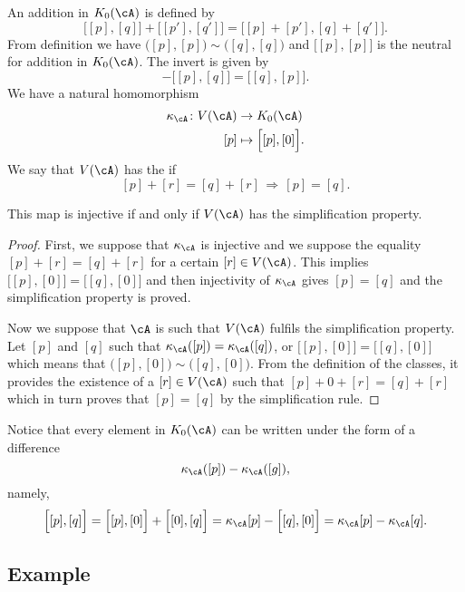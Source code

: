 An addition in $K_0(\cA)$ is defined by
\[
  \Big[ [p],[q] \Big]+\Big[ [p'],[q'] \Big]=\Big[ [p]+[p'],[q]+[q'] \Big].
\]
From definition we have $\Big( [p],[p] \Big)\sim\Big( [q],[q] \Big)$ and $\Big[ [p],[p] \Big]$ is the neutral for addition in $K_0(\cA)$. The invert is given by
\[
  -\Big[ [p],[q] \Big]=\Big[ [q],[p] \Big].
\]
We have a natural homomorphism
\begin{equation}
\begin{aligned}
 \kappa_{\cA}\colon V(\cA)&\to K_0(\cA) \\
[p]&\mapsto  \Big[ [p],[0] \Big].
\end{aligned}
\end{equation}
We say that $V(\cA)$ has the  if
\[
  [p]+[r]=[q]+[r]\,\Rightarrow\,[p]=[q].
\]

\begin{proposition}
This map is injective if and only if $V(\cA)$ has the simplification property.
\end{proposition}

\begin{proof}
First, we suppose that $\kappa_{\cA}$ is injective and we suppose the equality $[p]+[r]=[q]+[r]$ for a certain $[r]\in V(\cA)$. This implies $\Big[ [p],[0] \Big]=\Big[ [q],[0] \Big]$ and then injectivity of $\kappa_{\cA}$ gives $[p]=[q]$ and the simplification property is proved.

Now we suppose that $\cA$ is such that $V(\cA)$ fulfils the simplification property. Let $[p]$ and $[q]$ such that $\kappa_{\cA}([p])=\kappa_{\cA}([q])$, or $\Big[ [p],[0] \Big]=\Big[ [q],[0] \Big]$ which means that $\Big( [p],[0] \Big)\sim\Big( [q],[0] \Big)$. From the definition of the classes, it provides the existence of a $[r]\in V(\cA)$ such that $[p]+0+[r]=[q]+[r]$ which in turn proves that $[p]=[q]$ by the simplification rule.
\end{proof}

Notice that every element in $K_0(\cA)$ can be written under the form of a difference
\[
  \kappa_{\cA}([p])-\kappa_{\cA}([g]),
\]
namely,
\[
\begin{split}
\Big[ [p],[q] \Big]=\Big[ [p],[0] \Big]+\Big[ [0],[q] \Big]=\kappa_{\cA}[p]-\Big[ [q],[0] \Big]
	=\kappa_{\cA}[p]-\kappa_{\cA}[q].
\end{split}
\]

\subsection{Example}

